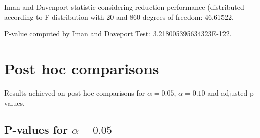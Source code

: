 \documentclass[a4paper,10pt]{article}
\begin{document}
\begin{landscape}
Iman and Davenport statistic considering reduction performance (distributed according to F-distribution with 20 and 860 degrees of freedom: 46.61522.

P-value computed by Iman and Daveport Test: 3.218005395634323E-122.\newline



\pagebreak

\section{Post hoc comparisons}

Results achieved on post hoc comparisons for $\alpha = 0.05$, $\alpha = 0.10$ and adjusted p-values.

\subsection{P-values for $\alpha=0.05$}


\end{landscape}
\end{document}
